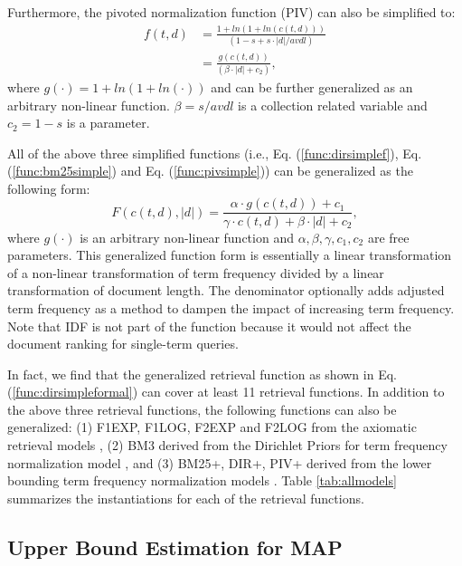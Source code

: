 Furthermore, the pivoted normalization function (PIV) \cite{Singhal:1996:PDL:243199.243206} can also 
be simplified to: 
\begin{equation}
\label{func:pivsimple}
\begin{split}
f(t,d) &= \frac{1+ln (1+ln (c(t, d)))}{(1-s+s \cdot |d|/avdl)} \\
&= \frac{g(c(t, d))}{(\beta \cdot |d| + c_2)}, 
\end{split}
\end{equation}
where $g(\cdot)=1+ln (1+ln (\cdot))$ and can be further 
generalized as an arbitrary non-linear function. $\beta=s/avdl$ 
is a collection related variable and $c_2=1-s$ is a parameter.


All of  the above three simplified functions (i.e., 
Eq. (\ref{func:dirsimplef}), Eq. (\ref{func:bm25simple}) 
and Eq. (\ref{func:pivsimple})) can be generalized as 
the following form: 
\begin{equation}
\label{func:dirsimpleformal}
F(c(t,d), |d|) = \frac{\alpha \cdot g(c(t, d))+c_1}{\gamma \cdot c(t,d) + \beta \cdot |d|+c_2}, 
\end{equation}
where $g(\cdot)$ is an arbitrary non-linear function and 
$\alpha, \beta, \gamma, c_1, c_2$ are free parameters. 
This generalized function form is essentially a linear 
transformation of a non-linear 
transformation of term frequency divided by a linear transformation of  
document length. The denominator optionally adds 
adjusted term frequency as a method to dampen the impact of increasing 
term frequency. Note that IDF is not part of the function because 
it would not affect the document ranking for single-term queries. 

In fact, we find that the generalized retrieval function as shown in 
Eq. (\ref{func:dirsimpleformal}) can cover at least 11 
retrieval functions.  In addition to the above three retrieval 
functions, the following functions can also be generalized: 
(1) F1EXP, F1LOG, F2EXP and F2LOG from the axiomatic retrieval 
models \cite{Fang:2005:EAA:1076034.1076116}, 
(2) BM3 derived from the Dirichlet Priors for term frequency normalization model 
\cite{He:2005:SDP:1076034.1076114}, 
and (3) BM25+, DIR+, PIV+ derived from the lower bounding
term frequency normalization models \cite{Lv:2011:LTF:2063576.2063584}. 
Table \ref{tab:allmodels} summarizes the instantiations for each of 
the retrieval functions. 


\subsection{Upper Bound Estimation for MAP}

